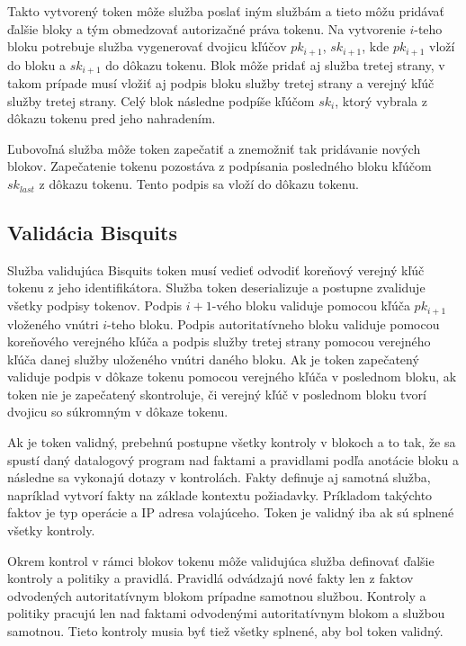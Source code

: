 Takto vytvorený token môže služba poslať iným službám a tieto môžu pridávať ďalšie bloky a tým obmedzovať autorizačné práva tokenu. Na vytvorenie $i$-teho bloku potrebuje služba vygenerovať dvojicu kľúčov $pk_{i+1}$, $sk_{i+1}$, kde $pk_{i+1}$ vloží do bloku a $sk_{i+1}$ do dôkazu tokenu. Blok môže pridať aj služba tretej strany, v takom prípade musí vložiť aj podpis bloku služby tretej strany a verejný kľúč služby tretej strany. Celý blok následne podpíše kľúčom $sk_i$, ktorý vybrala z dôkazu tokenu pred jeho nahradením.

Ľubovoľná služba môže token zapečatiť a znemožniť tak pridávanie nových blokov. Zapečatenie tokenu pozostáva z podpísania posledného bloku kľúčom $sk_{last}$ z dôkazu tokenu. Tento podpis sa vloží do dôkazu tokenu.

\subsection{Validácia Bisquits}

Služba validujúca Bisquits token musí vedieť odvodiť koreňový verejný kľúč tokenu z jeho identifikátora. Služba token deserializuje a postupne zvaliduje všetky podpisy tokenov. Podpis $i+1$-vého bloku validuje pomocou kľúča $pk_{i+1}$ vloženého vnútri $i$-teho bloku. Podpis autoritatívneho bloku validuje pomocou koreňového verejného kľúča a podpis služby tretej strany pomocou verejného kľúča danej služby uloženého vnútri daného bloku. Ak je token zapečatený validuje podpis v dôkaze tokenu pomocou verejného kľúča v poslednom bloku, ak token nie je zapečatený skontroluje, či verejný kľúč v poslednom bloku tvorí dvojicu so súkromným v dôkaze tokenu.

Ak je token validný, prebehnú postupne všetky kontroly v blokoch a to tak, že sa spustí daný datalogový program nad faktami a pravidlami podľa anotácie bloku a následne sa vykonajú dotazy v kontrolách. Fakty definuje aj samotná služba, napríklad vytvorí fakty na základe kontextu požiadavky. Príkladom takýchto faktov je typ operácie a IP adresa volajúceho. Token je validný iba ak sú splnené všetky kontroly. 

Okrem kontrol v rámci blokov tokenu môže validujúca služba definovať ďalšie kontroly a politiky a pravidlá. Pravidlá odvádzajú nové fakty len z faktov odvodených autoritatívnym blokom prípadne samotnou službou. Kontroly a politiky pracujú len nad faktami odvodenými autoritatívnym blokom a službou samotnou. Tieto kontroly musia byť tiež všetky splnené, aby bol token validný.

